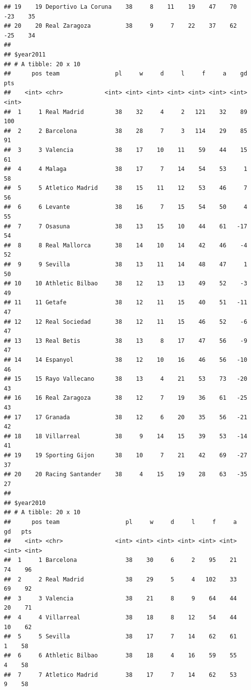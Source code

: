 \documentclass[]{tufte-handout}
\begin{document}
\begin{verbatim}
## 19    19 Deportivo La Coruna    38     8    11    19    47    70   -23    35
## 20    20 Real Zaragoza          38     9     7    22    37    62   -25    34
## 
## $year2011
## # A tibble: 20 x 10
##      pos team                pl     w     d     l     f     a    gd   pts
##    <int> <chr>            <int> <int> <int> <int> <int> <int> <int> <int>
##  1     1 Real Madrid         38    32     4     2   121    32    89   100
##  2     2 Barcelona           38    28     7     3   114    29    85    91
##  3     3 Valencia            38    17    10    11    59    44    15    61
##  4     4 Malaga              38    17     7    14    54    53     1    58
##  5     5 Atletico Madrid     38    15    11    12    53    46     7    56
##  6     6 Levante             38    16     7    15    54    50     4    55
##  7     7 Osasuna             38    13    15    10    44    61   -17    54
##  8     8 Real Mallorca       38    14    10    14    42    46    -4    52
##  9     9 Sevilla             38    13    11    14    48    47     1    50
## 10    10 Athletic Bilbao     38    12    13    13    49    52    -3    49
## 11    11 Getafe              38    12    11    15    40    51   -11    47
## 12    12 Real Sociedad       38    12    11    15    46    52    -6    47
## 13    13 Real Betis          38    13     8    17    47    56    -9    47
## 14    14 Espanyol            38    12    10    16    46    56   -10    46
## 15    15 Rayo Vallecano      38    13     4    21    53    73   -20    43
## 16    16 Real Zaragoza       38    12     7    19    36    61   -25    43
## 17    17 Granada             38    12     6    20    35    56   -21    42
## 18    18 Villarreal          38     9    14    15    39    53   -14    41
## 19    19 Sporting Gijon      38    10     7    21    42    69   -27    37
## 20    20 Racing Santander    38     4    15    19    28    63   -35    27
## 
## $year2010
## # A tibble: 20 x 10
##      pos team                   pl     w     d     l     f     a    gd   pts
##    <int> <chr>               <int> <int> <int> <int> <int> <int> <int> <int>
##  1     1 Barcelona              38    30     6     2    95    21    74    96
##  2     2 Real Madrid            38    29     5     4   102    33    69    92
##  3     3 Valencia               38    21     8     9    64    44    20    71
##  4     4 Villarreal             38    18     8    12    54    44    10    62
##  5     5 Sevilla                38    17     7    14    62    61     1    58
##  6     6 Athletic Bilbao        38    18     4    16    59    55     4    58
##  7     7 Atletico Madrid        38    17     7    14    62    53     9    58

\end{verbatim}
\end{document}
